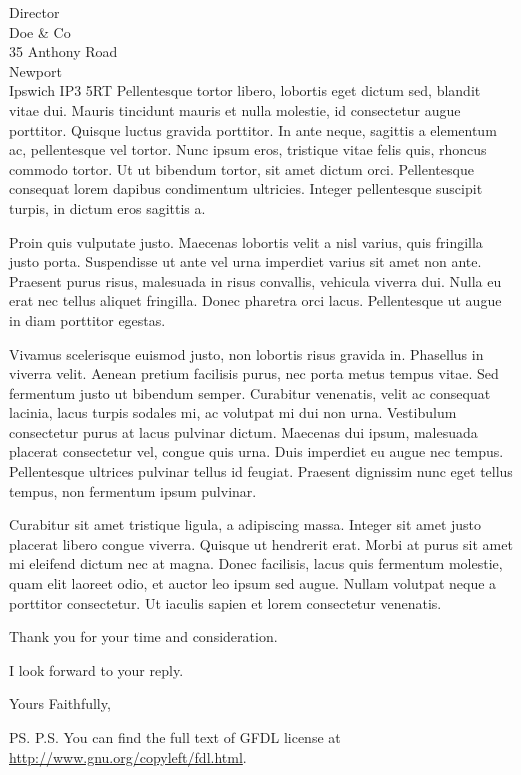 \documentclass{letter}
\begin{document}
\begin{letter}{Director \\ Doe \& Co \\ 35 Anthony Road
\\ Newport \\ Ipswich IP3 5RT}
 Pellentesque tortor libero, lobortis eget dictum sed, blandit vitae dui. Mauris tincidunt mauris et nulla molestie, id consectetur augue porttitor. Quisque luctus gravida porttitor. In ante neque, sagittis a elementum ac, pellentesque vel tortor. Nunc ipsum eros, tristique vitae felis quis, rhoncus commodo tortor. Ut ut bibendum tortor, sit amet dictum orci. Pellentesque consequat lorem dapibus condimentum ultricies. Integer pellentesque suscipit turpis, in dictum eros sagittis a. 

 Proin quis vulputate justo. Maecenas lobortis velit a nisl varius, quis fringilla justo porta. Suspendisse ut ante vel urna imperdiet varius sit amet non ante. Praesent purus risus, malesuada in risus convallis, vehicula viverra dui. Nulla eu erat nec tellus aliquet fringilla. Donec pharetra orci lacus. Pellentesque ut augue in diam porttitor egestas. 

 Vivamus scelerisque euismod justo, non lobortis risus gravida in. Phasellus in viverra velit. Aenean pretium facilisis purus, nec porta metus tempus vitae. Sed fermentum justo ut bibendum semper. Curabitur venenatis, velit ac consequat lacinia, lacus turpis sodales mi, ac volutpat mi dui non urna. Vestibulum consectetur purus at lacus pulvinar dictum. Maecenas dui ipsum, malesuada placerat consectetur vel, congue quis urna. Duis imperdiet eu augue nec tempus. Pellentesque ultrices pulvinar tellus id feugiat. Praesent dignissim nunc eget tellus tempus, non fermentum ipsum pulvinar. 

 Curabitur sit amet tristique ligula, a adipiscing massa. Integer sit amet justo placerat libero congue viverra. Quisque ut hendrerit erat. Morbi at purus sit amet mi eleifend dictum nec at magna. Donec facilisis, lacus quis fermentum molestie, quam elit laoreet odio, et auctor leo ipsum sed augue. Nullam volutpat neque a porttitor consectetur. Ut iaculis sapien et lorem consectetur venenatis.
 
Thank you for your time and consideration.
 
I look forward to your reply.


 
\closing{Yours Faithfully,}

\ps{P.S. You can find the full text of GFDL license at
\url{http://www.gnu.org/copyleft/fdl.html}.\\}
{\color{gray}}
 
\end{letter}
 
\end{document}
